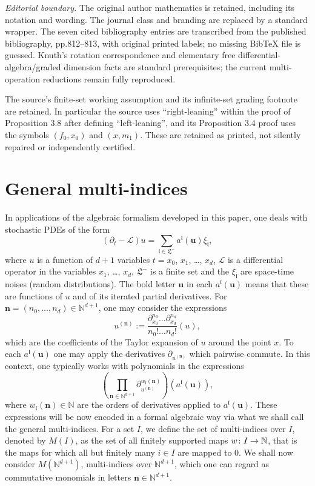 \documentclass[10pt,a4paper]{article}
\theoremstyle{definition}
\numberwithin{equation}{section}
\numberwithin{figure}{section}
\newcommand{\bn}{\mathbf{n}}
\newcommand{\bu}{\mathbf{u}}
\newcommand{\mcL}{\mathcal{L}}
\newcommand{\mfl}{\mathfrak{l}}
\newcommand{\mfL}{\mathfrak{L}}
\newcommand{\bbN}{\mathbb{N}}
\renewcommand*{\to}{\mathchoice{\longrightarrow}{\rightarrow}{\rightarrow}{\rightarrow}}
\begin{document}
\par\noindent\textit{Editorial boundary.} The original author mathematics is retained, including its notation and wording. The journal class and branding are replaced by a standard wrapper. The seven cited bibliography entries are transcribed from the published bibliography, pp.812--813, with original printed labels; no missing BibTeX file is guessed. Knuth's rotation correspondence and elementary free differential-algebra/graded dimension facts are standard prerequisites; the current multi-operation reductions remain fully reproduced.
\par\noindent The source's finite-set working assumption and its infinite-set grading footnote are retained. In particular the source uses ``right-leaning'' within the proof of Proposition 3.8 after defining ``left-leaning'', and its Proposition 3.4 proof uses the symbols $(f_0,x_0)$ and $(x,m_1)$. These are retained as printed, not silently repaired or independently certified.

\setcounter{section}{1}
\setcounter{footnote}{2}

\section{General multi-indices}\label{sec::2}

In applications of the algebraic formalism developed in this paper, one deals with stochastic PDEs of the form
\begin{equation}\label{set01}
\left(\partial_t - \mcL \right) u = \sum_{\mfl\in\mfL^-} a^\mfl (\bu) \xi_\mfl,
\end{equation}
where $u$ is a function of $d+1$ variables $t=x_0$, $x_1$, \dots, $x_d$, $\mcL$ is a differential operator in the variables $x_1$, \dots, $x_d$, $\mfL^- $ is a finite set and the $ \xi_{\mfl} $ are space-time noises (random distributions). The bold letter $\bu$ in each $a^\mfl(\bu)$ means that these are functions of $u$ and of its iterated partial derivatives. For $\bn=(n_0,\dots,n_d)\in\bbN^{d+1}$, one may consider the expressions
\[
u^{(\bn)}:=\frac{\partial_{x_0}^{n_0}\dots \partial_{x_d}^{n_d}}{n_0!\dots n_d!}(u),
\]
which are the coefficients of the Taylor expansion of $u$ around the point $x$. To each $a^\mfl (\bu)$ one may apply the derivatives $\partial_{u^{(\bn)}}$ which pairwise commute. In this context, one typically works with polynomials in the expressions
\[
\left(\prod_{\bn\in\bbN^{d+1}} \partial_{u^{(\bn)}}^{w_{\mfl}(\bn)}\right) (a^\mfl (\bu)),
\]
where $w_{\mfl}(\bn)\in\bbN$ are the orders of derivatives applied to $a^\mfl (\bu)$. These expressions will be now encoded in a formal algebraic way via what we shall call the general multi-indices. For a set $I$, we define the set of multi-indices over $I$, denoted by $M(I)$, as the set of all finitely supported maps $w\colon I\to\bbN$, that is the maps for which all but finitely many $i\in I$ are mapped to $0$. We shall now consider $M(\bbN^{d+1})$, multi-indices over $\bbN^{d+1}$, which one can regard as commutative monomials in letters $\bn\in\bbN^{d+1}$.
\end{document}
